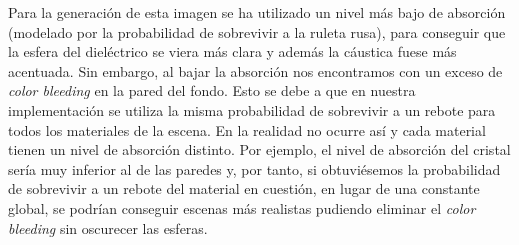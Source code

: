 \documentclass[10pt,oneside,a4paper]{article}
\begin{document}
Para la generación de esta imagen se ha utilizado un nivel más bajo de absorción (modelado por la probabilidad de sobrevivir a la ruleta rusa), para conseguir que la esfera del dieléctrico se viera más clara y además la cáustica fuese más acentuada. Sin embargo, al bajar la absorción nos encontramos con un exceso de \textit{color bleeding} en la pared del fondo. Esto se debe a que en nuestra implementación se utiliza la misma probabilidad de sobrevivir a un rebote para todos los materiales de la escena. En la realidad no ocurre así y cada material tienen un nivel de absorción distinto. Por ejemplo, el nivel de absorción del cristal sería muy inferior al de las paredes y, por tanto, si obtuviésemos la probabilidad de sobrevivir a un rebote del material en cuestión, en lugar de una constante global, se podrían conseguir escenas más realistas pudiendo eliminar el \textit{color bleeding} sin oscurecer las esferas.
\end{document}

